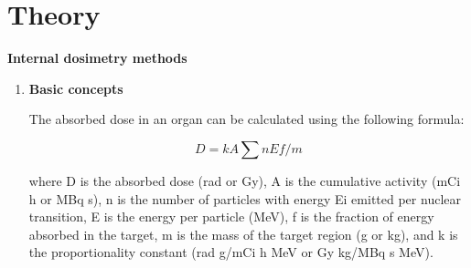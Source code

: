 \documentclass[12pt]{article}
\begin{document}
\section{Theory}
\textbf{Internal dosimetry methods}
\begin{enumerate}
 \item  \textbf{Basic concepts} \par The absorbed dose in an organ can be calculated using the following formula: \par
	\begin{equation}
	D = {kA\sum nEf/m} 
	\end{equation}
	\par where D is the absorbed dose (rad or Gy), A is the cumulative activity (mCi h or MBq s), n is the number of particles with energy Ei emitted per nuclear 			transition, E is the energy per particle (MeV), f is the fraction of energy absorbed in the target, m is the mass of the target region (g or kg), and k is 				the proportionality constant (rad g/mCi h MeV or Gy kg/MBq s MeV).

\end{enumerate}
\end{document}
